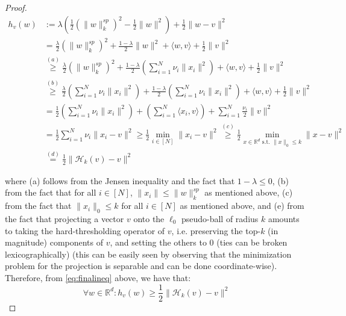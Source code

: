 \documentclass{article}
\begin{document}
\begin{proof}
\begin{align}
h_{v}(w)&:=\lambda \left(\frac{1}{2} \left(\|w\|_k^{s p}\right)^2 - \frac{1}{2} \|w\|^2 \right) + \frac{1}{2} \|w - v \|^2 \nonumber\\
    &=\frac{\lambda}{2} \left(\|w\|_k^{s p}\right)^2 + \frac{1 - \lambda}{2} \| w \|^2 + \langle w, v \rangle + \frac{1}{2}\|v\|^2\nonumber\\
&\overset{(a)}{\geq} \frac{\lambda}{2} \left(\|w\|_k^{s p}\right)^2 +  \frac{1 - \lambda}{2} \left( \sum_{i=1}^N \nu_i \| x_i \|^2 \right)+ \langle w, v \rangle + \frac{1}{2}\|v\|^2\nonumber\\
&\overset{(b)}{\geq } \frac{\lambda}{2} \left(\sum_{i=1}^N\nu_i \|x_i\|^2\right) +  \frac{1 - \lambda}{2} \left( \sum_{i=1}^N \nu_i \| x_i \|^2 \right)+ \langle w, v \rangle + \frac{1}{2}\|v\|^2\nonumber\\
&= \frac{1}{2} \left(\sum_{i=1}^N\nu_i \|x_i\|^2\right) + \left(\sum_{i=1}^N \langle x_i, v \rangle\right) + \sum_{i=1}^N  \frac{\nu_i}{2}\|v\|^2\nonumber\\
&= \frac{1}{2}\sum_{i=1}^N \nu_i\| x_i  - v \|^2 \geq \frac{1}{2}\min_{i \in [N]}\| x_i  - v \|^2 \overset{(c)}{\geq} \frac{1}{2}\min_{x \in \mathbb{R}^d \text{ s.t. } \|x \|_0\leq k} \| x  - v \|^2\nonumber\\
&\overset{(d)}{=} \frac{1}{2} \|\mathcal{H}_k(v) - v \|^2 \label{eq:finalineq}
\end{align}

where (a) follows from the Jensen inequality and the fact that $1 - \lambda \leq 0 $, (b) from the fact that for all $i \in [N]$, $\| x_i \| \leq \| w \|_{k}^{sp}$ as mentioned above, (c) from the fact that $\| x_i \|_0 \leq k$ for all $i \in [N]$ as mentioned above, and (e) from the fact that projecting a vector $v$ onto the $\ell_0$ pseudo-ball of radius $k$ amounts to taking the hard-thresholding operator of $v$, i.e. preserving the top-$k$ (in magnitude) components of $v$, and setting the others to 0 (ties can be broken lexicographically) (this can be easily seen by observing that the minimization problem for the projection is separable and can be done coordinate-wise).
Therefore, from \eqref{eq:finalineq} above, we have that: 
\begin{equation}\label{eq:bound}
    \forall w \in \mathbb{R}^d: h_{v}(w) \geq \frac{1}{2} \| \mathcal{H}_k(v) - v\|^2
\end{equation}


\end{proof}
\end{document}
